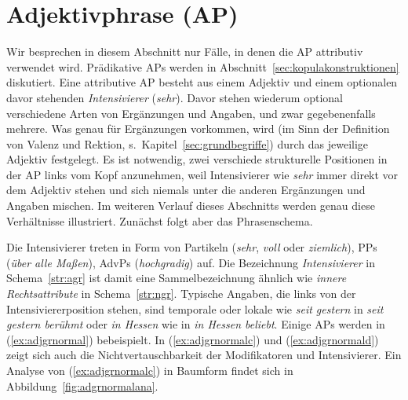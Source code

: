\begin{exe}
  \ex\label{ex:grp9001}
  \begin{xlist}
  \end{xlist}
\end{exe}

\section{Adjektivphrase (AP)}

\label{sec:agr}

Wir besprechen in diesem Abschnitt nur Fälle, in denen die AP attributiv verwendet wird.
Prädikative APs werden in Abschnitt~\ref{sec:kopulakonstruktionen} diskutiert.
Eine attributive AP besteht aus einem Adjektiv und einem optionalen davor stehenden \textit{Intensivierer} (\zB \textit{sehr}).
Davor stehen wiederum optional verschiedene Arten von Ergänzungen und Angaben, und zwar gegebenenfalls mehrere. 
Was genau für Ergänzungen vorkommen, wird (im Sinn der Definition von Valenz und Rektion, s.\ Kapitel~\ref{sec:grundbegriffe}) durch das jeweilige Adjektiv festgelegt.
Es ist notwendig, zwei verschiede strukturelle Positionen in der AP links vom Kopf anzunehmen, weil Intensivierer wie \textit{sehr} immer direkt vor dem Adjektiv stehen und sich niemals unter die anderen Ergänzungen und Angaben mischen.
Im weiteren Verlauf dieses Abschnitts werden genau diese Verhältnisse illustriert.
Zunächst folgt aber das Phrasenschema.



Die Intensivierer treten in Form von Partikeln (\zB \textit{sehr}, \textit{voll} oder \textit{ziemlich}), PPs (\zB \textit{über alle Maßen}), AdvPs (\zB \textit{hochgradig}) auf.
Die Bezeichnung \textit{Intensivierer} in Schema~\ref{str:agr} ist damit eine Sammelbezeichnung ähnlich wie \textit{innere Rechtsattribute} in Schema~\ref{str:ngr}.
Typische Angaben, die links von der Intensiviererposition stehen, sind \zB temporale oder lokale wie \textit{seit gestern} in \textit{seit gestern berühmt} oder \textit{in Hessen} wie in \textit{in Hessen beliebt}. 
Einige APs werden in (\ref{ex:adjgrnormal}) bebeispielt.
In (\ref{ex:adjgrnormalc}) und (\ref{ex:adjgrnormald}) zeigt sich auch die Nichtvertauschbarkeit der Modifikatoren und Intensivierer.
Ein Analyse von (\ref{ex:adjgrnormalc}) in Baumform findet sich in Abbildung~\ref{fig:adgrnormalana}.

